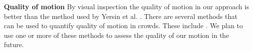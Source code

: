 \textbf{Quality of motion}
By visual inspection the quality of motion in our approach is better than the method used by Yersin et al. \cite{Yersin:2009}. There are several methods that can be used to quantify quality of motion in crowds. These include \note{(=====================)}. We plan to use one or more of these methods to assess the quality of our motion in the future.

